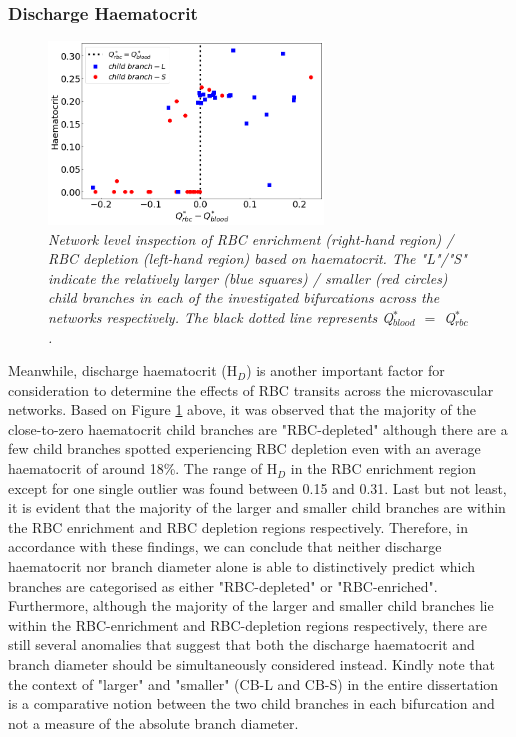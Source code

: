 \subsubsection{Discharge Haematocrit}
\begin{figure}[H]
\centering
\includegraphics[width=0.65\textwidth]{images/DisproportionalityIndexHD.png}
\caption{\textit{Network level inspection of RBC enrichment (right-hand region) / RBC depletion (left-hand region) based on haematocrit. The "L"/"S" indicate the relatively larger (blue squares) / smaller (red circles) child branches in each of the investigated bifurcations across the networks respectively. The black dotted line represents Q$^{*}_{blood}$ $=$ Q$^{*}_{rbc}$.} \label{DisproportionalityIndexHD}}
\end{figure}

\noindent Meanwhile, discharge haematocrit (H$_{D}$) is another important factor for consideration to determine the effects of RBC transits across the microvascular networks. Based on Figure \ref{DisproportionalityIndexHD} above, it was observed that the majority of the close-to-zero haematocrit child branches are "RBC-depleted" although there are a few child branches spotted experiencing RBC depletion even with an average haematocrit of around 18\%. The range of H$_{D}$ in the RBC enrichment region except for one single outlier was found between 0.15 and 0.31. Last but not least, it is evident that the majority of the larger and smaller child branches are within the RBC enrichment and RBC depletion regions respectively. Therefore, in accordance with these findings, we can conclude that neither discharge haematocrit nor branch diameter alone is able to distinctively predict which branches are categorised as either "RBC-depleted" or "RBC-enriched". Furthermore, although the majority of the larger and smaller child branches lie within the RBC-enrichment and RBC-depletion regions respectively, there are still several anomalies that suggest that both the discharge haematocrit and branch diameter should be simultaneously considered instead. Kindly note that the context of "larger" and "smaller" (CB-L and CB-S) in the entire dissertation is a comparative notion between the two child branches in each bifurcation and not a measure of the absolute branch diameter. 

